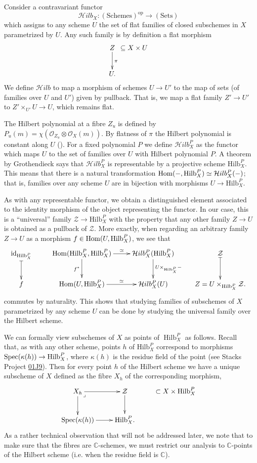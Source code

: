 \medskip\noindent
Consider a contravariant functor
$$
\mathcal{H}ilb_X:(\text{Schemes})^{\text{op}}\to (\text{Sets})
$$
which assigns to any scheme $U$ the set of
flat families
of closed subschemes in $X$ parametrized by
$U$.
Any such family is by definition a flat
morphism
$$
\xymatrix@C=.1em{
Z \ar[d]^\pi&\subseteq X \times U\\
U.
}
$$
We define $\mathcal{H}ilb$ to map a morphism
of schemes
$U \to U'$ to the map of sets (of families
over $U$ and $U'$) given
by pullback. That is, we map a flat family
$Z'\to U'$
to $Z'\times_{U'}U \to U$, which remains
flat.

The Hilbert polynomial at a fibre $Z_u$ is
defined by
$P_u(m)=\chi(\mathcal{O}_{Z_u}\otimes
\mathcal{O}_X(m))$.
By flatness of $\pi$ the Hilbert polynomial
is constant along $U$
(\cite[Part III, Theorem 9.9]{Hartshorne}).
For a fixed polynomial $P$
we define $\mathcal{H}ilb^P_X$ as the
functor which maps $U$
to the set of families over $U$ with Hilbert
polynomial $P$.
A theorem by Grothendieck says that
$\mathcal{H}ilb^P_X$ is representable
by a projective scheme $\text{Hilb}^P_X$.
This means that there is a natural
transformation
$\mathop{\mathrm{Hom}}\nolimits(-,\text{Hilb}^P_X) \simeq
\mathcal{H}ilb^P_X(-)$;
that is, families over any scheme $U$ are in
bijection with
morphisms $U \to \text{Hilb}^P_X$.

As with any representable functor,
we obtain a distinguished element associated
to the identity morphism
of the object representing the functor.
In our case, this is a
``universal'' family $\mathcal{Z} \to
\text{Hilb}^P_X$
with the property that any other family $Z
\to U$ is obtained as a pullback
of $\mathcal{Z}$.
More exactly, when regarding an arbitrary
family $Z \to U$ as a morphism
$f \in \mathop{\mathrm{Hom}}\nolimits(U,\text{Hilb}^P_X)$, we see that
$$
\xymatrix{
\text{id}_{\text{Hilb}^P_X}\ar@{|->}[d]
&\Hom(\text{Hilb}^P_X,\text{Hilb}^P_X)\ar[r]^-{\simeq}\ar[d]_{f^*}
&\mathcal{H}ilb^P_X(\text{Hilb}^P_X)\ar[d]^{U\times_{\text{Hilb}_X^P}-}
&\mathcal{Z}\ar@{|->}[d]\\
f&\Hom(U,\text{Hilb}^P_X)\ar[r]^-{\simeq}
 &\mathcal{H}ilb^P_X(U)&
Z=U\times_{\text{Hilb}_X^P}\mathcal{Z}.
}
$$
commutes by naturality.
This shows that studying families of
subschemes of $X$ parametrized by any
scheme $U$ can be done by studying the
universal family
over the Hilbert scheme.

We can formally view subschemes of $X$
as points of $\operatorname{Hilb}_X^P$ as
follows.
Recall that, as with any other scheme,
points $h$ of $\text{Hilb}_X^P$ correspond
to morphisms
$\mathop{\mathrm{Spec}}(\kappa(h)) \to \text{Hilb}^P_X$,
where $\kappa(h)$ is the residue field of
the point
(see Stacks Project
\href{https://stacks.math.columbia.edu/tag/01J9}{01J9}).
Then for every point $h$ of the Hilbert
scheme
we have a unique subscheme
of $X$ defined as the fibre $X_h$
of the corresponding morphism,
$$
\xymatrix{
X_h\ar[r]\ar[d]\ar@{}[dr]|<{\lrcorner}&\mathcal{Z}\ar[d]
& \subset X \times \text{Hilb}^P_X\\
\Spec(\kappa(h))\ar[r]&\text{Hilb}^P_X.
}
$$
As a rather technical observation that will
not be
addressed later, we note that
to make sure that the fibres are
$\mathbb{C}$-schemes,
we must restrict our analysis to
$\mathbb{C}$-points
of the Hilbert scheme (i.e. when the residue
field is $\mathbb{C}$).

